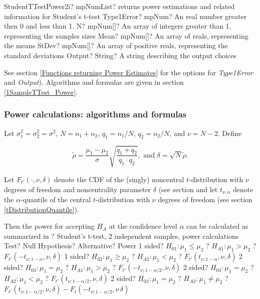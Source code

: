 \begin{mpFunctionsExtract}
	\mpFunctionFiveNotImplemented
	{StudentTTestPower2i? mpNumList? returns power estimations and related information for Student's t-test}
	{Type1Error? mpNum? An real number greater then 0 and less than 1.}
	{N? mpNum[]? An array of integers greater than 1, representing the samples sizes}
	{Mean? mpNum[]? An array of reals, representing the means}
	{StDev? mpNum[]? An array of positive reals, representing the standard deviations}
	{Output? String? A string describing the output choices}
\end{mpFunctionsExtract}

\vspace{0.3cm}
See section \ref{Functions returning Power Estimates} for the options for {\itshape\sffamily Type1Error} and {\itshape\sffamily Output}). Algorithms and formulas are given in section \ref{1SampleTTest_Power}.


\subsubsection{Power calculations: algorithms and formulas}
\label{2iSampleTTest_Power}
Let $\sigma_1^2 = \sigma_2^2 = \sigma^2$, $N = n_1 + n_2$, $q_1 = n_1 /N$, $q_2 = n_2 /N$, and $\nu=N-2$. Define

\begin{equation} \label{eq:TTestPower2i}
	\widetilde{\rho} = \frac{\mu_1-\mu_2}{\sigma} \sqrt{\frac{q_1+q_2}{q_1 \cdot q_2}}, \text{ and } \delta = \sqrt{N} \widetilde{\rho}.
\end{equation}


Let $F_{t'}\left(\cdot, \nu, \delta \right)$ denote the CDF of the (singly) noncentral $t$-distribution with $\nu$ degrees of freedom and noncentrality parameter $\delta$ (see section 
and let $t_{\nu,\alpha}$ denote the $\alpha$-quantile of the central $t$-distribution with $\nu$ degrees of freedom (see section \ref{tDistributionQuantile}).


\mpTableFourColsTwoRowsThreeRows
{Then the power for accepting $H_A$ at the confidence level $\alpha$ can be calculated as summarized in ? Student's t-test, 2 independent samples, power calculations}
{Test? Null Hypothesis? Alternative? Power}
{1 sided? $H_{01}: \mu_1 \leq \mu_2$ ? $H_{A1}: \mu_1 > \mu_2$ ? $F_{t'}\left(-t_{\nu;1-\alpha}, \nu, \delta \right)$}
{1 sided? $H_{02}: \mu_1 \geq \mu_2$ ? $H_{A2}: \mu_1 < \mu_2$ ? $F_{t'}\left(t_{\nu;1-\alpha}, \nu, \delta \right)$}
{2 sided? $H_{03}: \mu_1 = \mu_2$ ? $H_{A1}: \mu_1 > \mu_2$ ? $F_{t'}\left(-t_{\nu;1-\alpha/2}, \nu, \delta \right)$}
{2 sided? $H_{03}: \mu_1 = \mu_2$ ? $H_{A2}: \mu_1 < \mu_2$ ? $F_{t'}\left(t_{\nu;1-\alpha/2}, \nu, \delta \right)$}
{2 sided? $H_{03}: \mu_1 = \mu_2$ ? $H_{A3}: \mu_1 \neq \mu_2$ ? $F_{t'}\left(t_{\nu;1-\alpha/2}, \nu, \delta \right)-F_t\left(-t_{\nu;1-\alpha/2}, \nu\, \delta \right)$}





